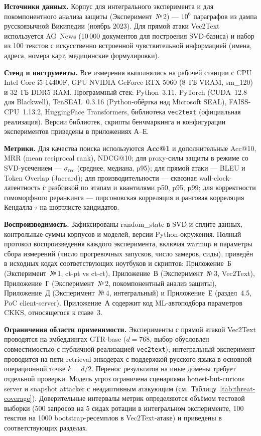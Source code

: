 \documentclass[a4paper, 12pt, oneside, openany]{article}
\begin{document}
\textbf{Источники данных.} Корпус для интегрального эксперимента и для покомпонентного анализа защиты (Эксперимент~№\,2) --- $10^6$ параграфов из дампа русскоязычной Википедии (ноябрь 2023). Для прямой атаки Vec2Text используется AG~News (10\,000 документов для построения SVD-базиса) и набор из 100 текстов с искусственно встроенной чувствительной информацией (имена, адреса, номера карт, медицинские формулировки).

\textbf{Стенд и инструменты.} Все измерения выполнялись на рабочей станции с CPU Intel Core i5-14400F, GPU NVIDIA GeForce RTX 5060 (8~ГБ VRAM, sm\_120) и 32~ГБ DDR5 RAM. Программный стек: Python~3.11, PyTorch (CUDA~12.8 для Blackwell), TenSEAL~0.3.16 (Python-обёртка над Microsoft SEAL), FAISS-CPU~1.13.2, HuggingFace Transformers, библиотека \texttt{vec2text} (официальная реализация). Версии библиотек, скрипты бенчмаркинга и конфигурации экспериментов приведены в приложениях А--Е.

\textbf{Метрики.} Для качества поиска используются \textbf{Acc@1} и дополнительные Acc@10, MRR (mean reciprocal rank), NDCG@10; для proxy-силы защиты в режиме со SVD-усечением --- $\sigma_{\mathrm{rec}}$ (среднее, медиана, p95); для прямой атаки --- BLEU и Token Overlap (Jaccard); для производительности --- сквозная wall-clock-латентность с разбивкой по этапам и квантилями p50, p95, p99; для корректности гомоморфного реранкинга --- пирсоновская корреляция и ранговая корреляция Кендалла $\tau$ на шортлисте кандидатов.

\textbf{Воспроизводимость.} Зафиксированы random\_state в SVD и сплите данных, контрольные суммы корпусов и моделей, версии Python-окружения. Полный протокол воспроизведения каждого эксперимента, включая warmup и параметры сбора измерений (число прогревочных запусков, число замеров, сиды), приведён в исходных кодах соответствующих ноутбуков и скриптов: Приложение~Б (Эксперимент~№\,1, ct-pt vs ct-ct), Приложение~В (Эксперимент~№\,3, Vec2Text), Приложение~Г (Эксперимент~№\,2, покомпонентный анализ защиты), Приложение~Д (Эксперимент~№\,4, интегральный) и Приложение~Е (раздел~4.5, PoC client-server). Приложение~А содержит код ML-автоподбора параметров CKKS, относящегося к главе~3.

\textbf{Ограничения области применимости.} Эксперименты с прямой атакой Vec2Text проводятся на эмбеддингах GTR-base ($d = 768$, выбор обусловлен совместимостью с публичной реализацией \texttt{vec2text}); интегральный эксперимент проводится на пяти retrieval-энкодерах с поддержкой русского языка в основной операционной точке $k = d/2$. Перенос результатов на иные домены требует отдельной проверки. Модель угроз ограничена сценариями honest-but-curious server и snapshot attacker с неадаптивным атакующим (см.\ Таблицу~\ref{tab:threat-coverage}). Доверительные интервалы метрик определяются объёмом тестовой выборки (500 запросов на 5 сидах ротации в интегральном эксперименте, 100 текстов на 1000 bootstrap-ресемплов в Vec2Text-атаке) и приведены в соответствующих разделах.
\end{document}
